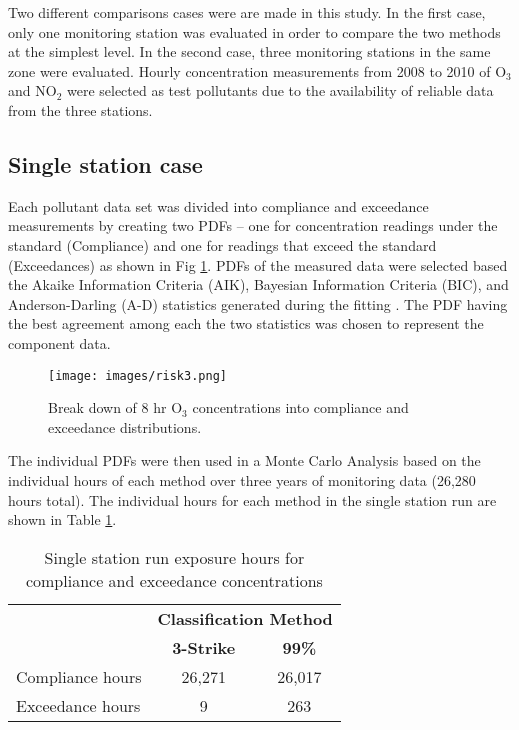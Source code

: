 Two different comparisons cases were are made in this study. In the first case, only one monitoring station was evaluated in order to compare the two methods at the simplest level. In the second case, three monitoring stations in the same zone were evaluated.  Hourly concentration measurements from 2008 to 2010 of O$_{3}$ and NO$_{2}$ were selected as test pollutants due to the availability of reliable data from the three stations. 

\subsection{Single station case}

Each pollutant data set was divided into compliance and exceedance measurements by creating two PDFs – one for concentration readings under the standard (Compliance) and one for readings that exceed the standard (Exceedances) as shown in Fig \ref{fig3:distributions}.  PDFs of the measured data were selected based the Akaike Information Criteria (AIK), Bayesian Information Criteria (BIC), and Anderson-Darling (A-D) statistics generated during the fitting \citep{Palisades2016}.  The PDF having the best agreement among each the two statistics was chosen to represent the component data.  
%  
\begin{figure}[H]
\texttt{[image: images/risk3.png]} 
\caption{Break down of 8 hr O$_{3}$ concentrations into compliance and exceedance distributions.}
\label{fig3:distributions}
\end{figure}
%
The individual PDFs were then used in a Monte Carlo Analysis based on the individual hours of each method over three years of monitoring data (26,280 hours total).  The individual hours for each method in the single station run are shown in Table \ref{tb3:exphrs}. 
%
\begin{table}[H]
\centering
\caption{Single station run exposure hours for compliance and exceedance concentrations}
\label{tb3:exphrs}
\begin{tabular}{@{}lcc@{}}
\toprule
 & \multicolumn{2}{c}{\textbf{Classification Method}} \\ 
 & \textbf{3-Strike} & \textbf{99\%} \\ \midrule
Compliance hours & 26,271 & 26,017 \\
Exceedance hours & 9 & 263 \\ \bottomrule
\end{tabular}
\end{table}
